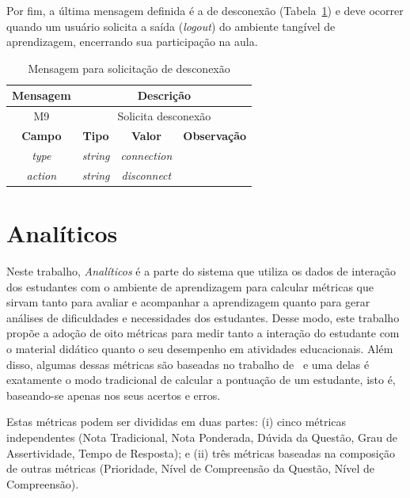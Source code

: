 
Por fim, a última mensagem definida é a de desconexão (Tabela~\ref{tab:desconexao}) e deve ocorrer quando um usuário solicita a saída (\textit{logout}) do ambiente tangível de aprendizagem, encerrando sua participação na aula.

\begin{table}[htb]
	\centering
	\caption{Mensagem para solicitação de desconexão}
	\begin{tabular}{|c|ccc|}
		\hline
		\rowcolor[HTML]{C0C0C0} 
		\textbf{Mensagem} & \multicolumn{3}{c|}{\cellcolor[HTML]{C0C0C0}\textbf{Descrição}} \\ \hline
		M9 & \multicolumn{3}{c|}{Solicita desconexão} \\ \hline
		\rowcolor[HTML]{C0C0C0} 
		\textbf{Campo} & \multicolumn{1}{c|}{\cellcolor[HTML]{C0C0C0}\textbf{Tipo}} & \multicolumn{1}{c|}{\cellcolor[HTML]{C0C0C0}\textbf{Valor}} & \textbf{Observação} \\ \hline
		\textit{type} & \multicolumn{1}{c|}{\textit{string}} & \multicolumn{1}{c|}{\textit{connection}} &  \\ \hline
		\textit{action} & \multicolumn{1}{c|}{\textit{string}} & \multicolumn{1}{c|}{\textit{disconnect}} &  \\ \hline
	\end{tabular}
	\label{tab:desconexao}	
\end{table}


\section{Analíticos}\label{section:analytics}

Neste trabalho, \textit{Analíticos} é a parte do sistema que utiliza os dados de interação dos estudantes com o ambiente de aprendizagem para calcular métricas que sirvam 
tanto para avaliar e acompanhar a aprendizagem quanto para gerar análises de dificuldades e necessidades dos estudantes.
Desse modo, este trabalho propõe a adoção de oito métricas para medir tanto a interação do estudante com o material didático quanto o seu desempenho em atividades educacionais. Além disso, algumas dessas métricas são baseadas no trabalho de~\cite{Biswas:2007} e uma delas é exatamente o modo tradicional de calcular a pontuação de um estudante, isto é, baseando-se apenas nos seus acertos e erros.

Estas métricas podem ser divididas em duas partes: (i) cinco métricas independentes (Nota Tradicional, Nota Ponderada, Dúvida da Questão, Grau de Assertividade, Tempo de Resposta); e (ii) três métricas baseadas na composição de outras métricas (Prioridade, Nível de Compreensão da Questão, Nível de Compreensão).

